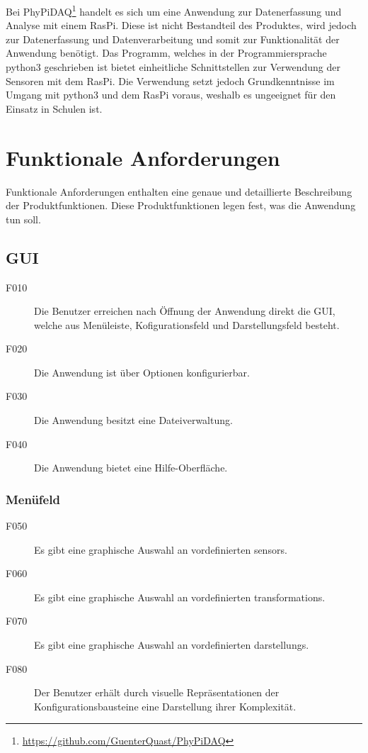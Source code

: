 \documentclass[parskip=full]{scrartcl}
\begin{document}
Bei PhyPiDAQ\footnote{\url{https://github.com/GuenterQuast/PhyPiDAQ}} handelt es sich um eine Anwendung zur Datenerfassung und Analyse mit einem \gls{RasPi}. Diese ist nicht Bestandteil des Produktes, wird jedoch zur Datenerfassung und Datenverarbeitung und somit zur Funktionalität der Anwendung  benötigt. Das Programm, welches in der Programmiersprache \gls{python3} geschrieben ist bietet einheitliche Schnittstellen zur Verwendung der Sensoren mit dem \gls{RasPi}. Die Verwendung setzt jedoch Grundkenntnisse im Umgang mit \gls{python3} und dem \gls{RasPi} voraus, weshalb es ungeeignet für den Einsatz in Schulen ist.

\clearpage
\section{Funktionale Anforderungen}\label{funktionale}

Funktionale Anforderungen enthalten eine genaue und detaillierte Beschreibung der Produktfunktionen. Diese Produktfunktionen legen fest, was die Anwendung tun soll.


\subsection{GUI} %

\begin{description}
\item[F010] Die Benutzer erreichen nach Öffnung der Anwendung direkt die \gls{GUI}, welche aus Menüleiste, Kofigurationsfeld und Darstellungsfeld besteht.
\item[F020] Die Anwendung ist über Optionen konfigurierbar. 
\item[F030] Die Anwendung besitzt eine Dateiverwaltung.
\item[F040] Die Anwendung bietet eine Hilfe-Oberfläche.
\end{description}

\subsubsection{Menüfeld}

\begin{description}
\item[F050] Es gibt eine graphische Auswahl an vordefinierten \glspl{sensor}.
\item[F060] Es gibt eine graphische Auswahl an vordefinierten \glspl{transformation}.
\item[F070] Es gibt eine graphische Auswahl an vordefinierten \glspl{darstellung}.
\item[F080] Der Benutzer erhält durch visuelle Repräsentationen der Konfigurationsbausteine eine Darstellung ihrer Komplexität.
\end{description}
\end{document}
